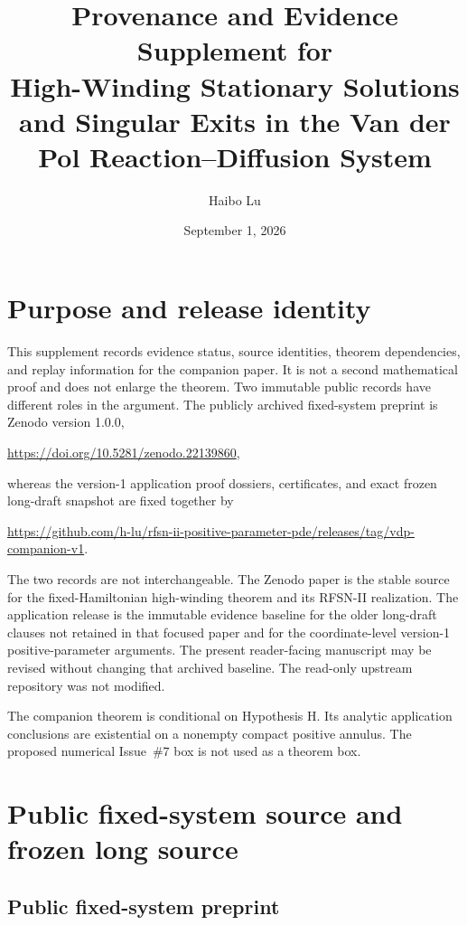 \documentclass[11pt,reqno]{amsart}
\title[Provenance supplement]{Provenance and Evidence Supplement for\\
High-Winding Stationary Solutions and Singular Exits in the Van der Pol
Reaction--Diffusion System}
\author{Haibo Lu}
\date{September 1, 2026}
\begin{document}
\maketitle

\section{Purpose and release identity}

This supplement records evidence status, source identities, theorem
dependencies, and replay information for the companion paper.  It is not a
second mathematical proof and does not enlarge the theorem.  Two immutable
public records have different roles in the argument.  The publicly archived
fixed-system preprint is Zenodo version 1.0.0,

\begin{center}
 \url{https://doi.org/10.5281/zenodo.22139860},
\end{center}

whereas the version-1 application proof dossiers, certificates, and exact
frozen long-draft snapshot are fixed together by

\begin{center}
 \url{https://github.com/h-lu/rfsn-ii-positive-parameter-pde/releases/tag/vdp-companion-v1}.
\end{center}

The two records are not interchangeable.  The Zenodo paper is the stable
source for the fixed-Hamiltonian high-winding theorem and its RFSN-II
realization.  The application release is the immutable evidence baseline for
the older long-draft clauses not retained in that focused paper and for the
coordinate-level version-1 positive-parameter arguments.  The present
reader-facing manuscript may be revised without changing that archived
baseline.  The read-only upstream repository was not modified.

The companion theorem is conditional on Hypothesis H.  Its analytic
application conclusions are existential on a nonempty compact positive
annulus.  The proposed numerical Issue~\#7 box is not used as a theorem box.

\section{Public fixed-system source and frozen long source}

\subsection{Public fixed-system preprint}
\end{document}
